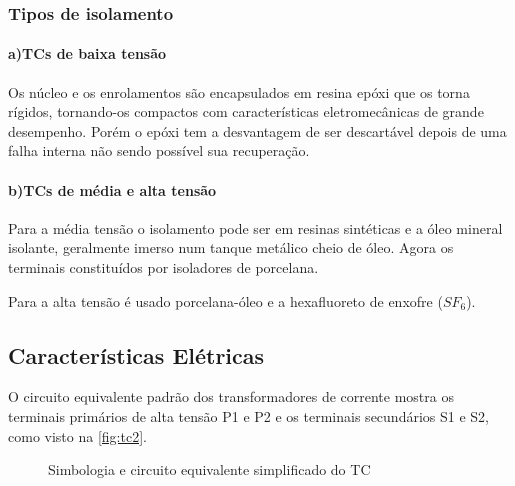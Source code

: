 			\subsubsection{Tipos de isolamento}
				\paragraph*{a)\indent TCs de baixa tensão}
					Os núcleo e os enrolamentos são encapsulados em resina epóxi que os torna rígidos, tornando-os compactos com características eletromecânicas de grande desempenho. Porém o epóxi tem a desvantagem de ser descartável depois de uma falha interna não sendo possível sua recuperação.
				\paragraph*{b)\indent TCs de média e alta tensão}
					Para a média tensão o isolamento pode ser em resinas sintéticas e a óleo mineral isolante, geralmente imerso num tanque metálico cheio de óleo. Agora os terminais constituídos por isoladores de porcelana.\par
					Para a alta tensão é usado porcelana-óleo e a hexafluoreto de enxofre ($SF_6$).\par

		\subsection{Características Elétricas}
			O circuito equivalente padrão dos transformadores de corrente mostra os terminais primários de alta tensão P1 e P2 e os terminais secundários S1 e S2, como visto na \autoref{fig:tc2}.\par
			\begin{figure}[htb]
				\caption{Simbologia e circuito equivalente simplificado do TC}
				\centering
				\end{figure}
			
